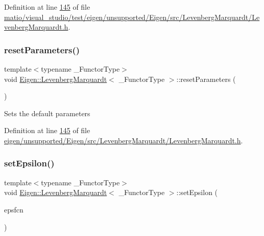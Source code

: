 Definition at line \hyperlink{matio_2visual__studio_2test_2eigen_2unsupported_2_eigen_2src_2_levenberg_marquardt_2_levenberg_marquardt_8h_source_l00145}{145} of file \hyperlink{matio_2visual__studio_2test_2eigen_2unsupported_2_eigen_2src_2_levenberg_marquardt_2_levenberg_marquardt_8h_source}{matio/visual\+\_\+studio/test/eigen/unsupported/\+Eigen/src/\+Levenberg\+Marquardt/\+Levenberg\+Marquardt.\+h}.

\mbox{\label{class_eigen_1_1_levenberg_marquardt_a16172a2048058ea0a908213a7b0f8971}} 
\subsubsection{\texorpdfstring{reset\+Parameters()}{resetParameters()}\hspace{0.1cm}{\footnotesize\ttfamily [2/2]}}
{\footnotesize\ttfamily template$<$typename \+\_\+\+Functor\+Type$>$ \\
void \hyperlink{class_eigen_1_1_levenberg_marquardt}{Eigen\+::\+Levenberg\+Marquardt}$<$ \+\_\+\+Functor\+Type $>$\+::reset\+Parameters (\begin{DoxyParamCaption}{ }\end{DoxyParamCaption})\hspace{0.3cm}{\ttfamily [inline]}}

Sets the default parameters 

Definition at line \hyperlink{eigen_2unsupported_2_eigen_2src_2_levenberg_marquardt_2_levenberg_marquardt_8h_source_l00145}{145} of file \hyperlink{eigen_2unsupported_2_eigen_2src_2_levenberg_marquardt_2_levenberg_marquardt_8h_source}{eigen/unsupported/\+Eigen/src/\+Levenberg\+Marquardt/\+Levenberg\+Marquardt.\+h}.

\mbox{\label{class_eigen_1_1_levenberg_marquardt_a3e13f6631ae59be984ee1ea196899cd7}} 
\subsubsection{\texorpdfstring{set\+Epsilon()}{setEpsilon()}\hspace{0.1cm}{\footnotesize\ttfamily [1/2]}}
{\footnotesize\ttfamily template$<$typename \+\_\+\+Functor\+Type$>$ \\
void \hyperlink{class_eigen_1_1_levenberg_marquardt}{Eigen\+::\+Levenberg\+Marquardt}$<$ \+\_\+\+Functor\+Type $>$\+::set\+Epsilon (\begin{DoxyParamCaption}\item[{Real\+Scalar}]{epsfcn }\end{DoxyParamCaption})\hspace{0.3cm}{\ttfamily [inline]}}

